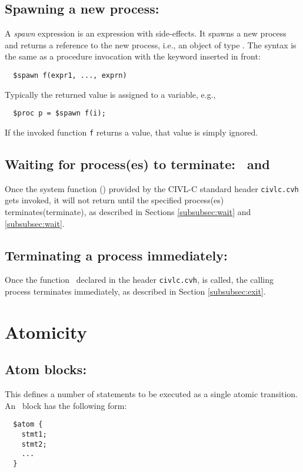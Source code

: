 \subsection{Spawning a new process: \cspawn}

A \emph{spawn} expression is an expression with side-effects.  It
spawns a new process and returns a reference to the new process, i.e.,
an object of type \cproc.  The syntax is the same as a procedure
invocation with the keyword \cspawn{} inserted in front:
\begin{verbatim}
  $spawn f(expr1, ..., exprn)
\end{verbatim}
Typically the returned value is assigned to a variable, e.g.,
\begin{verbatim}
  $proc p = $spawn f(i);
\end{verbatim}
If the invoked function \texttt{f} returns a value, that value is
simply ignored.

\subsection{Waiting for process(es) to terminate: \cwait\ and \cwaitall}

Once the system function \cwait(\cwaitall) provided by the CIVL-C standard header \texttt{civlc.cvh} 
gets invoked, it will not return until the specified process(es) terminates(terminate), as described in Sections \ref{subsubsec:wait} and
\ref{subsubsec:wait}.

\subsection{Terminating a process immediately: \cexit}
Once the function \cexit\, declared in the header \texttt{civlc.cvh}, is called, the calling process terminates immediately, as described in Section \ref{subsubsec:exit}.

\section{Atomicity}

\subsection{Atom blocks: \catom} This defines a number of statements
to be executed as a single atomic transition.  An \catom~block has the
following form:
\begin{verbatim}
  $atom {
    stmt1;
    stmt2;
    ...
  }
\end{verbatim}

